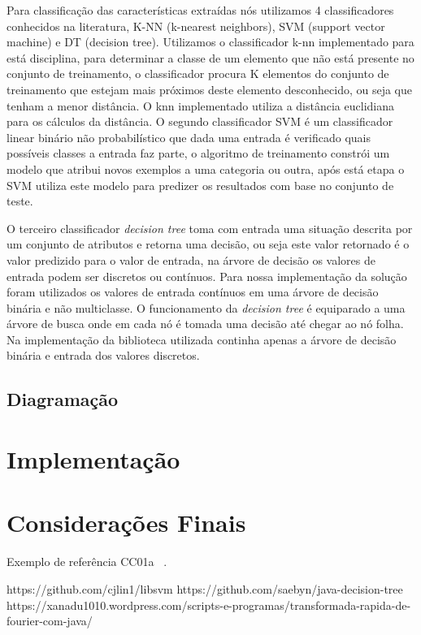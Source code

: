 \documentclass[12pt]{article}
\begin{document}
	Para classificação das características extraídas nós utilizamos 4 classificadores conhecidos na literatura, K-NN (k-nearest neighbors), SVM (support vector machine) e DT (decision tree). Utilizamos o classificador k-nn implementado para está disciplina, para determinar a classe de um elemento que não está presente no conjunto de treinamento, o classificador procura K elementos do conjunto de treinamento que estejam mais próximos deste elemento desconhecido, ou seja que tenham a menor distância. O knn implementado utiliza a distância euclidiana para os cálculos da distância.
	O segundo classificador SVM é um classificador linear binário não probabilístico que dada uma entrada é verificado quais possíveis classes a entrada faz parte, o algoritmo de treinamento constrói um modelo que atribui novos exemplos a uma categoria ou outra, após está etapa o SVM utiliza este modelo para predizer os resultados com base no conjunto de teste.

	O terceiro classificador \textit{decision tree} toma com entrada uma situação descrita por um conjunto de atributos e retorna uma decisão, ou seja este valor retornado é o valor predizido para o valor de entrada, na árvore de decisão os valores de entrada podem ser discretos ou contínuos. Para nossa implementação da solução foram utilizados os valores de entrada contínuos em uma árvore de decisão binária e não multiclasse. O funcionamento da \textit{decision tree} é equiparado a uma árvore de busca onde em cada nó é tomada uma decisão até chegar ao nó folha. Na implementação da biblioteca utilizada continha apenas a árvore de decisão binária e entrada dos valores discretos.





\subsection{Diagramação}\label{sec:diagramacao}
	
	




\section{Implementação}



\section{Considerações Finais}


Exemplo de referência CC01a ~\cite{CC01}.

https://github.com/cjlin1/libsvm
https://github.com/saebyn/java-decision-tree
https://xanadu1010.wordpress.com/scripts-e-programas/transformada-rapida-de-fourier-com-java/

{}

\end{document}
